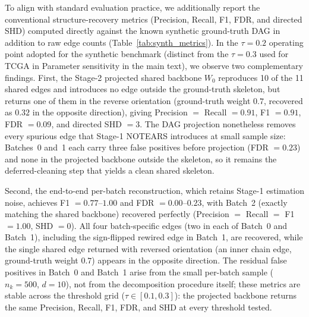 \documentclass[11pt]{article}
\begin{document}
To align with standard evaluation practice, we additionally report the conventional structure-recovery metrics (Precision, Recall, F1, FDR, and directed SHD) computed directly against the known synthetic ground-truth DAG in addition to raw edge counts (Table~\ref{tab:synth_metrics}). In the $\tau=0.2$ operating point adopted for the synthetic benchmark (distinct from the $\tau=0.3$ used for TCGA in Parameter sensitivity in the main text), we observe two complementary findings. First, the Stage-2 projected shared backbone $W_0$ reproduces 10 of the 11 shared edges and introduces no edge outside the ground-truth skeleton, but returns one of them in the reverse orientation (ground-truth weight $0.7$, recovered as $0.32$ in the opposite direction), giving Precision $=$ Recall $=0.91$, F1 $=0.91$, FDR $=0.09$, and directed SHD $=3$. The DAG projection nonetheless removes every spurious edge that Stage-1 NOTEARS introduces at small sample size: Batches~0 and~1 each carry three false positives before projection (FDR $=0.23$) and none in the projected backbone outside the skeleton, so it remains the deferred-cleaning step that yields a clean shared skeleton.

Second, the end-to-end per-batch reconstruction, which retains Stage-1 estimation noise, achieves F1 $=0.77$--$1.00$ and FDR $=0.00$--$0.23$, with Batch~2 (exactly matching the shared backbone) recovered perfectly (Precision $=$ Recall $=$ F1 $=1.00$, SHD $=0$). All four batch-specific edges (two in each of Batch~0 and Batch~1), including the sign-flipped rewired edge in Batch~1, are recovered, while the single shared edge returned with reversed orientation (an inner chain edge, ground-truth weight $0.7$) appears in the opposite direction. The residual false positives in Batch~0 and Batch~1 arise from the small per-batch sample ($n_k = 500$, $d=10$), not from the decomposition procedure itself; these metrics are stable across the threshold grid ($\tau \in [0.1, 0.3]$): the projected backbone returns the same Precision, Recall, F1, FDR, and SHD at every threshold tested.
\end{document}
